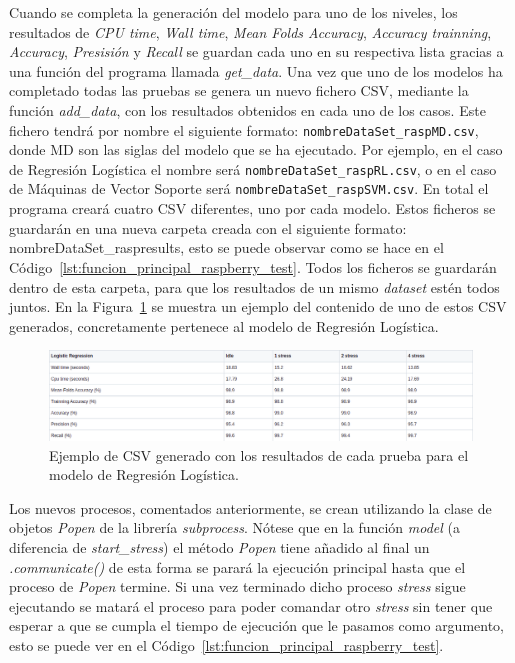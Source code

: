 \documentclass[a4paper, 12pt]{book}
\begin{document}
Cuando se completa la generación del modelo para uno de los niveles, los resultados de \textit{CPU time}, \textit{Wall time}, \textit{Mean Folds Accuracy}, \textit{Accuracy trainning}, \textit{Accuracy}, \textit{Presisión} y \textit{Recall} se guardan cada uno en su respectiva lista gracias a una función del programa llamada \textit{get\_data}. Una vez que uno de los modelos ha completado todas las pruebas se genera un nuevo fichero CSV, mediante la función \textit{add\_data}, con los resultados obtenidos en cada uno de los casos.
Este fichero tendrá por nombre el siguiente formato: \texttt{nombreDataSet\_raspMD.csv}, donde MD son las siglas del modelo que se ha ejecutado. Por ejemplo, en el caso de Regresión Logística el nombre será \texttt{nombreDataSet\_raspRL.csv}, o en el caso de Máquinas de Vector Soporte será \texttt{nombreDataSet\_raspSVM.csv}. En total el programa creará cuatro CSV diferentes, uno por cada modelo. Estos ficheros se guardarán en una nueva carpeta creada con el siguiente formato: nombreDataSet\_raspresults, esto se puede observar como se hace en el Código~\ref{lst:funcion_principal_raspberry_test}. Todos los ficheros se guardarán dentro de esta carpeta, para que los resultados de un mismo \textit{dataset} estén todos juntos. En la Figura~\ref{fig:ejemplo_csv} se muestra un ejemplo del contenido de uno de estos CSV generados, concretamente pertenece al modelo de Regresión Logística.

\begin{figure}[]
  \centering
  \includegraphics[width=16cm, keepaspectratio]{img/ejemplo_csv.png}
  \caption{Ejemplo de CSV generado con los resultados de cada prueba para el modelo de Regresión Logística.}\label{fig:ejemplo_csv}
\end{figure}

Los nuevos procesos, comentados anteriormente, se crean utilizando la clase de objetos \textit{Popen} de la librería \textit{subprocess}. Nótese que en la función \textit{model} (a diferencia de \textit{start\_stress}) el método \textit{Popen} tiene añadido al final un \textit{.communicate()} de esta forma se parará la ejecución principal hasta que el proceso de \textit{Popen} termine. Si una vez terminado dicho proceso \textit{stress} sigue ejecutando se matará el proceso para poder comandar otro \textit{stress} sin tener que esperar a que se cumpla el tiempo de ejecución que le pasamos como argumento, esto se puede ver en el Código~\ref{lst:funcion_principal_raspberry_test}.
\end{document}
